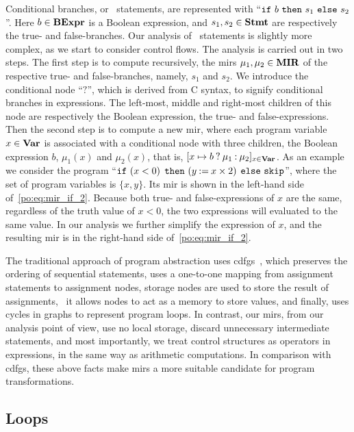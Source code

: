 Conditional branches, or \iflit~statements, are represented with ``$\texttt{if}~
b~ \texttt{then}~ s_1~ \texttt{else}~ s_2$''.  Here $b \in \mathbf{BExpr}$ is a Boolean
expression, and $s_1, s_2 \in \mathbf{Stmt}$ are respectively the true- and
false-branches.  Our analysis of \iflit~statements is slightly more complex,
as we start to consider control flows.  The analysis is carried out in two
steps.  The first step is to compute recursively, the \glspl{mir} $\mu_1,
\mu_2 \in \mathbf{MIR}$ of the respective true- and false-branches, namely, $s_1$
and $s_2$.  We introduce the conditional node ``$?$'', which is derived from C
syntax, to signify conditional branches in expressions.  The left-most, middle
and right-most children of this node are respectively the Boolean expression,
the true- and false-expressions.  Then the second step is to compute a
new \gls{mir}, where each program variable $x \in \mathbf{Var}$ is associated
with a conditional node with three children, the Boolean expression $b$,
$\mu_1(x)$ and $\mu_2(x)$, that is, $[x \mapsto b\mathbin{?}\mu_1\mathbin{:}\mu_2]_{x
\in \mathbf{Var}}$.  As an example we consider the program ``$\texttt{if}~(x < 0)$
$\texttt{then}~(y \mathbin{:=} x \times 2)$ $\texttt{else}~\mathtt{skip}$'', where the set of
program variables is $\{x, y\}$.  Its \gls{mir} is shown in the left-hand side
of~\eqref{po:eq:mir_if_2}.  Because both true- and false-expressions of $x$
are the same, regardless of the truth value of $x < 0$, the two expressions
will evaluated to the same value.  In our analysis we further simplify the
expression of $x$, and the resulting \gls{mir} is in the right-hand side
of~\eqref{po:eq:mir_if_2}.

The traditional approach of program abstraction uses
\glspl{cdfg}~\cite{namballa04}, which preserves the ordering of sequential
statements, uses a one-to-one mapping from assignment statements to assignment
nodes, storage nodes are used to store the result of assignments, \ie~it allows
nodes to act as a memory to store values, and finally, uses cycles in graphs to
represent program loops.  In contrast, our \glspl{mir}, from our analysis point
of view, use no local storage, discard unnecessary intermediate statements,
and most importantly, we treat control structures as operators in expressions,
in the same way as arithmetic computations.  In comparison with \glspl{cdfg},
these above facts make \glspl{mir} a more suitable candidate for program
transformations.

\subsection{Loops}


